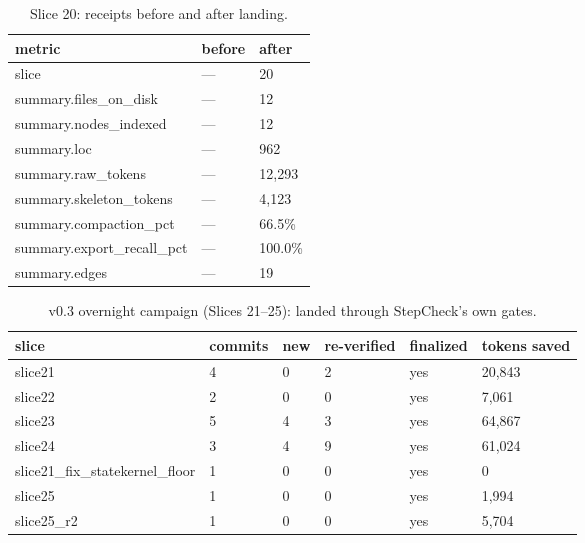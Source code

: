 \documentclass{article}
\begin{document}
\begin{table}[h]
\centering
\begin{tabular}{lll}
\toprule
metric & before & after \\
\midrule
slice & — & 20 \\
summary.files\_on\_disk & — & 12 \\
summary.nodes\_indexed & — & 12 \\
summary.loc & — & 962 \\
summary.raw\_tokens & — & 12,293 \\
summary.skeleton\_tokens & — & 4,123 \\
summary.compaction\_pct & — & 66.5\% \\
summary.export\_recall\_pct & — & 100.0\% \\
summary.edges & — & 19 \\
\bottomrule
\end{tabular}
\caption{Slice 20: receipts before and after landing.}
\label{tab:slice20}
\end{table}
\begin{table}[h]
\centering
\begin{tabular}{llllll}
\toprule
slice & commits & new & re-verified & finalized & tokens saved \\
\midrule
slice21 & 4 & 0 & 2 & yes & 20,843 \\
slice22 & 2 & 0 & 0 & yes & 7,061 \\
slice23 & 5 & 4 & 3 & yes & 64,867 \\
slice24 & 3 & 4 & 9 & yes & 61,024 \\
slice21\_fix\_statekernel\_floor & 1 & 0 & 0 & yes & 0 \\
slice25 & 1 & 0 & 0 & yes & 1,994 \\
slice25\_r2 & 1 & 0 & 0 & yes & 5,704 \\
\bottomrule
\end{tabular}
\caption{v0.3 overnight campaign (Slices 21–25): landed through StepCheck's own gates.}
\label{tab:dogfood21_25}
\end{table}
\end{document}
